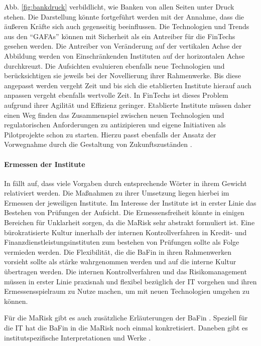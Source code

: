\medskip
Abb. \ref{fig:bankdruck} verbildlicht, wie Banken von allen Seiten unter Druck stehen. Die Darstellung könnte fortgeführt werden mit der Annahme, dass die äußeren Kräfte sich auch gegenseitig beeinflussen. Die Technologien und Trends aus den \enquote{GAFAs} können mit Sicherheit als ein Antreiber für die FinTechs gesehen werden. Die Antreiber von Veränderung auf der vertikalen Achse der Abbildung werden von Einschränkenden Instituten auf der horizontalen Achse durchkreuzt. Die Aufsichten evaluieren ebenfalls neue Technologien und berücksichtigen sie jeweils bei der Novellierung ihrer Rahmenwerke. Bis diese angepasst werden vergeht Zeit und bis sich die etablierten Institute hierauf auch anpassen vergeht ebenfalls wertvolle Zeit. In FinTechs ist dieses Problem aufgrund ihrer Agilität und Effizienz geringer. Etablierte Institute müssen daher einen Weg finden das Zusammenspiel zwischen neuen Technologien und regulatorischen Anforderungen zu antizipieren und eigene Initiativen als Pilotprojekte schon zu starten. Hierzu passt ebenfalls der Ansatz der Vorwegnahme durch die Gestaltung von Zukunftszuständen \cite{Alt2017}.


\paragraph{Ermessen der Institute}
In \cite{MaRisk:2017, BAIT:2018} fällt auf, dass viele Vorgaben durch entsprechende Wörter in ihrem Gewicht relativiert werden. Die Maßnahmen zu ihrer Umsetzung liegen hierbei im Ermessen der jeweiligen Institute. Im Interesse der Institute ist in erster Linie das Bestehen von Prüfungen der Aufsicht. Die Ermessensfreiheit könnte in einigen Bereichen für Unklarheit sorgen, da die \ac{MaRisk} sehr abstrakt formuliert ist.
Eine bürokratisierte Kultur innerhalb der internen Kontrollverfahren in Kredit- und Finanzdienstleistungsinstituten zum bestehen von Prüfungen sollte als Folge vermieden werden. Die Flexibilität, die die BaFin in ihren Rahmenwerken vorsieht \cite{MaRisk:2017} sollte als stärke wahrgenommen werden und auf die interne Kultur übertragen werden. Die internen Kontrollverfahren und das Risikomanagement müssen in erster Linie praxisnah und flexibel bezüglich der IT vorgehen und ihren Ermessensspielraum zu Nutze machen, um mit neuen Technologien umgehen zu können.

Für die \ac{MaRisk} gibt es auch zusätzliche Erläuterungen der BaFin \cite{MaRiskErläuterungen:2017}. Speziell für die IT hat die BaFin in \cite{BAIT:2018} die \ac{MaRisk} noch einmal konkretisiert. Daneben gibt es institutspezifische Interpretationen und Werke \cite{DSGV:2019}.

